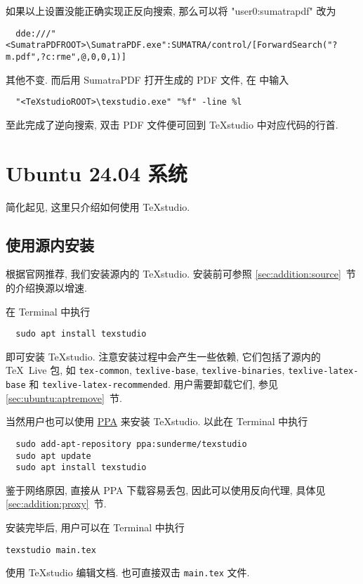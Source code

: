 如果以上设置没能正确实现正反向搜索,
那么可以将 "user0:sumatrapdf" 改为
\begin{lstlisting}
  dde:///"<SumatraPDFROOT>\SumatraPDF.exe":SUMATRA/control/[ForwardSearch("?m.pdf",?c:rme",@,0,0,1)]
\end{lstlisting}
其他不变.
而后用 SumatraPDF 打开生成的 PDF 文件,
在  中输入
\begin{lstlisting}
  "<TeXstudioROOT>\texstudio.exe" "%f" -line %l
\end{lstlisting}
至此完成了逆向搜索,
双击 PDF 文件便可回到 \TeX studio 中对应代码的行首.

\section{Ubuntu 24.04 系统}\label{sec:editor:ubuntu}

简化起见, 这里只介绍如何使用 \TeX studio.

\subsection{使用源内安装}

根据官网推荐, 我们安装源内的 \TeX studio.
安装前可参照 \ref{sec:addition:source}~节的介绍换源以增速.

在 \textsf{Terminal} 中执行
\begin{lstlisting}
  sudo apt install texstudio
\end{lstlisting}
即可安装 \TeX studio.
注意安装过程中会产生一些依赖, 它们包括了源内的 \TeX~Live 包, 如 \texttt{tex-common}, \texttt{texlive-base}, \texttt{texlive-binaries}, \texttt{texlive-latex-base} 和 \texttt{texlive-latex-recommended}.
用户需要卸载它们,
参见 \ref{sec:ubuntu:aptremove}~节.

当然用户也可以使用
\href{https://code.launchpad.net/~sunderme/+archive/ubuntu/texstudio}{PPA}
来安装 \TeX studio.
以此在 \textsf{Terminal} 中执行
\begin{lstlisting}
  sudo add-apt-repository ppa:sunderme/texstudio
  sudo apt update
  sudo apt install texstudio
\end{lstlisting}
鉴于网络原因,
直接从 PPA 下载容易丢包,
因此可以使用反向代理,
具体见 \ref{sec:addition:proxy}~节.

安装完毕后,
用户可以在 \textsf{Terminal} 中执行
\begin{lstlisting}[morekeywords = texstudio, deletekeywords = tex]
  texstudio main.tex
\end{lstlisting}
使用 \TeX studio 编辑文档.
也可直接双击 \texttt{main.tex} 文件.

